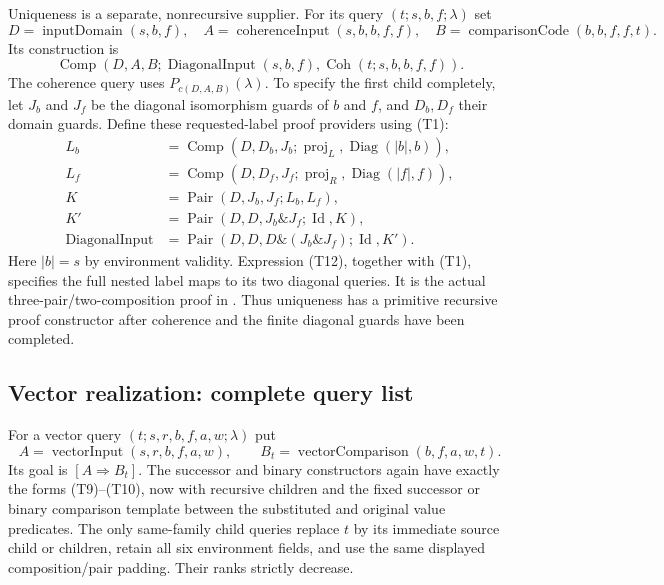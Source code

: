Uniqueness is a separate, nonrecursive supplier.  For its query
$(t;s,b,f;\lambda)$ set
\[
 D=\operatorname{inputDomain}(s,b,f),\quad
 A=\operatorname{coherenceInput}(s,b,b,f,f),\quad
 B=\operatorname{comparisonCode}(b,b,f,f,t).
\]
Its construction is
\[
 \operatorname{Comp}(D,A,B;
              \operatorname{DiagonalInput}(s,b,f),
              \operatorname{Coh}(t;s,b,b,f,f)).                \tag{T11}
\]
The coherence query uses $P_{c(D,A,B)}(\lambda)$.
To specify the first child completely, let $J_b$ and $J_f$ be the
diagonal isomorphism guards of $b$ and $f$, and $D_b,D_f$ their domain
guards.  Define these requested-label proof providers using (T1):
\[
\begin{aligned}
 L_b&=\operatorname{Comp}(D,D_b,J_b;\operatorname{proj}_L,
                                      \operatorname{Diag}(|b|,b)),\\
 L_f&=\operatorname{Comp}(D,D_f,J_f;\operatorname{proj}_R,
                                      \operatorname{Diag}(|f|,f)),\\
 K&=\operatorname{Pair}(D,J_b,J_f;L_b,L_f),\\
 K'&=\operatorname{Pair}(D,D,J_b\mathbin{\&}J_f;
                                      \operatorname{Id},K),\\
 \operatorname{DiagonalInput}
   &=\operatorname{Pair}(D,D,D\mathbin{\&}(J_b\mathbin{\&}J_f);
                                      \operatorname{Id},K').
\end{aligned}                                                   \tag{T12}
\]
Here $|b|=s$ by environment validity.  Expression (T12), together
with (T1), specifies the full nested label maps to its two diagonal
queries.  It is the actual three-pair/two-composition proof in
.
Thus uniqueness has a primitive recursive proof constructor after
coherence and the finite diagonal guards have been completed.

\subsection{Vector realization: complete query list}

For a vector query $(t;s,r,b,f,a,w;\lambda)$ put
\[
 A=\operatorname{vectorInput}(s,r,b,f,a,w),\qquad
 B_t=\operatorname{vectorComparison}(b,f,a,w,t).
\]
Its goal is $[A\Rightarrow B_t]$.  The successor and binary
constructors again have exactly the forms (T9)--(T10), now with
recursive  children and the fixed successor or binary
comparison template between the substituted and original value
predicates.  The only same-family child queries replace $t$ by its
immediate source child or children, retain all six environment fields,
and use the same displayed composition/pair padding.  Their ranks
strictly decrease.

